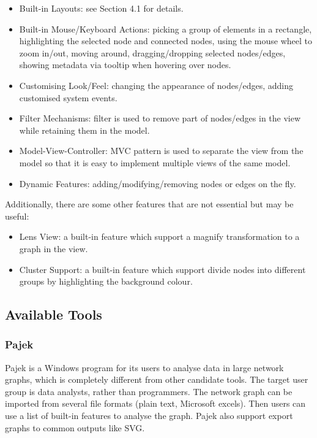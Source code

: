 \begin{itemize}
  \item Built-in Layouts: see Section 4.1 for details.
  \item Built-in Mouse/Keyboard Actions: picking a group of elements in a rectangle, highlighting the selected node and connected nodes, using the mouse wheel to zoom in/out, moving around, dragging/dropping selected nodes/edges, showing metadata via tooltip when hovering over nodes.
  \item Customising Look/Feel: changing the appearance of nodes/edges, adding customised system events.
  \item Filter Mechanisms: filter is used to remove part of nodes/edges in the view while retaining them in the model.
  \item Model-View-Controller: MVC pattern is used to separate the view from the model so that it is easy to implement multiple views of the same model.
  \item Dynamic Features: adding/modifying/removing nodes or edges on the fly.
\end{itemize}

Additionally, there are some other features that are not essential but may be useful:
\begin{itemize}
  \item Lens View: a built-in feature which support a magnify transformation to a graph in the view.
  \item Cluster Support: a built-in feature which support divide nodes into different groups by highlighting the background colour.
\end{itemize}

\subsection{Available Tools}

\subsubsection{Pajek}
Pajek is a Windows program for its users to analyse data in large network graphs, which is completely different from other candidate tools. The target user group is data analysts, rather than programmers. The network graph can be imported from several file formats (plain text, Microsoft excels). Then users can use a list of built-in features to analyse the graph. Pajek also support export graphs to common outputs like SVG.

